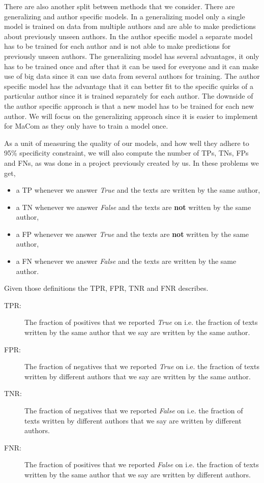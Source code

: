 There are also another split between methods that we consider. There are
generalizing and author specific models. In a generalizing model only a single
model is trained on data from multiple authors and are able to make predictions
about previously unseen authors. In the author specific model a separate model
has to be trained for each author and is not able to make predictions for
previously unseen authors. The generalizing model has several advantages, it
only has to be trained once and after that it can be used for everyone and
it can make use of big data since it can use data from several authors for
training. The author specific model has the advantage that it can better fit
to the specific quirks of a particular author since it is trained separately
for each author. The downside of the author specific approach is that a new
model has to be trained for each new author. We will focus on the generalizing
approach since it is easier to implement for MaCom as they only have to train a
model once.

As a unit of measuring the quality of our models, and how well they adhere to
95\% specificity constraint, we will also compute the number of \gls{TP}s,
\gls{TN}s, \gls{FP}s and \gls{FN}s, as was done in a project previously created
by us.\cite{US} In these problems we get,

\begin{itemize}
    \item a \gls{TP} whenever we answer \textit{True} and the texts are written
        by the same author,
    \item a \gls{TN} whenever we answer \textit{False} and the texts are
        \textbf{not} written by the same author,
    \item a \gls{FP} whenever we answer \textit{True} and the texts are
        \textbf{not} written by the same author,
    \item a \gls{FN} whenever we answer \textit{False} and the texts are written
        by the same author.
\end{itemize}

Given those definitions the \gls{TPR}, \gls{FPR}, \gls{TNR} and \gls{FNR}
describes.

\begin{description}
    \item[\gls{TPR}: ] The fraction of positives that we reported \textit{True}
        on i.e. the fraction of texts written by the same author that we say are
        written by the same author.
    \item[\gls{FPR}: ] The fraction of negatives that we reported \textit{True}
        on i.e. the fraction of texts written by different authors that we say
        are written by the same author.
    \item[\gls{TNR}: ] The fraction of negatives that we reported \textit{False}
        on i.e. the fraction of texts written by different authors that we say
        are written by different authors.
    \item[\gls{FNR}: ] The fraction of positives that we reported \textit{False}
        on i.e. the fraction of texts written by the same author that we say are
        written by different authors.
\end{description}


